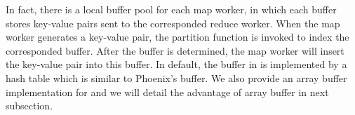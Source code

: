 


In fact, there is a local buffer pool for each map worker, in which each buffer stores key-value pairs sent to the corresponded reduce worker.
When the map worker generates a key-value pair, the partition function is invoked to index the corresponded buffer.
After the buffer is determined, the map worker will insert the key-value pair into this buffer.
In default, the buffer in \myds is implemented by a hash table which is similar to Phoenix's buffer.
We also provide an array buffer implementation for \myds and we will detail the advantage of array buffer in next subsection.







